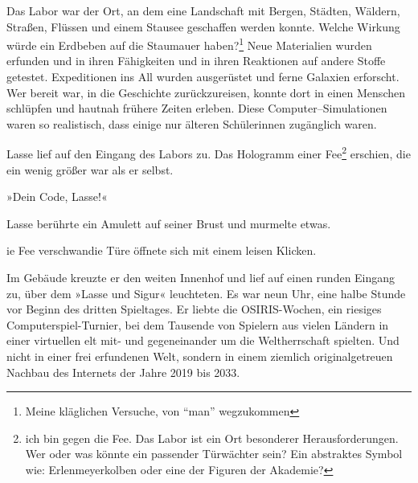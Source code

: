 Das Labor war der Ort, an dem eine Landschaft mit Bergen, Städten, Wäldern, Straßen,  Flüssen und einem Stausee geschaffen werden konnte. Welche Wirkung würde ein Erdbeben auf die Staumauer haben?\footnote{Meine kläglichen Versuche, von \enquote{man} wegzukommen}
Neue Materialien wurden erfunden und in ihren Fähigkeiten und in ihren Reaktionen auf andere Stoffe getestet.
Expeditionen ins All wurden ausgerüstet und ferne Galaxien erforscht.
Wer bereit war, in die Geschichte zurückzureisen, konnte dort in einen Menschen schlüpfen und hautnah frühere Zeiten erleben.
 Diese Computer--Simulationen waren so realistisch, dass einige  nur  älteren Schülerinnen zugänglich waren.

Lasse lief auf den Eingang des Labors zu. Das Hologramm einer Fee\footnote{ich bin gegen die Fee. Das Labor ist ein Ort besonderer Herausforderungen. Wer oder was könnte ein passender Türwächter sein? Ein abstraktes Symbol wie: Erlenmeyerkolben oder eine der Figuren der Akademie?} erschien, die ein wenig größer war als er selbst.

»Dein Code, Lasse!«

Lasse berührte ein Amulett auf seiner Brust und murmelte etwas.


ie Fee verschwandie Türe öffnete sich mit einem leisen Klicken.

Im Gebäude kreuzte er den weiten Innenhof und lief auf einen runden Eingang zu, über dem  »Lasse und Sigur« leuchteten.
Es war neun Uhr, eine halbe Stunde vor Beginn des dritten Spieltages.
Er liebte die OSIRIS-Wochen, ein riesiges Computerspiel-Turnier, bei dem Tausende von Spielern aus vielen Ländern in einer virtuellen elt mit- und gegeneinander um die Weltherrschaft spielten.
Und nicht in einer frei erfundenen Welt, sondern in einem ziemlich originalgetreuen Nachbau des Internets der Jahre 2019 bis 2033.

